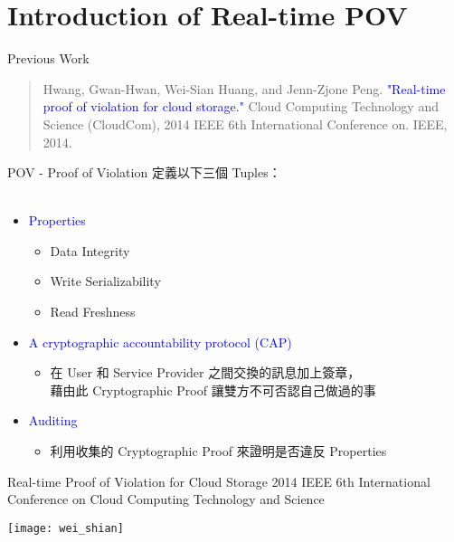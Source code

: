 \section{Introduction of Real-time POV}

\begin{frame}{Previous Work}
	\begin{quote}
    	\Large
    	Hwang, Gwan-Hwan, Wei-Sian Huang, and Jenn-Zjone Peng. \textcolor{blue}{"Real-time proof of violation for cloud storage."} Cloud Computing Technology and Science (CloudCom), 2014 IEEE 6th International Conference on. IEEE, 2014.
	\end{quote}
\end{frame}

\begin{frame}{POV - Proof of Violation}
	定義以下三個 Tuples：
    ~\\
    ~\\
	\begin{itemize}  
        \item \textcolor{blue}{Properties}
	        \begin{itemize}
            	\item Data Integrity
                \item Write Serializability
                \item Read Freshness
            \end{itemize}
        \item \textcolor{blue}{A cryptographic accountability protocol (CAP)}
	        \begin{itemize}
            	\item 在 User 和 Service Provider 之間交換的訊息加上簽章，\\ 藉由此 Cryptographic Proof 讓雙方不可否認自己做過的事
            \end{itemize}
        \item \textcolor{blue}{Auditing}
            \begin{itemize}
            	\item 利用收集的 Cryptographic Proof 來證明是否違反 Properties
            \end{itemize}
    \end{itemize}
\end{frame}

\begin{frame}{Real-time Proof of Violation for Cloud Storage}
{2014 IEEE 6th International Conference on Cloud Computing Technology and Science}
	\begin{center}
		\texttt{[image: wei\_shian]}
	\end{center}
\end{frame}


